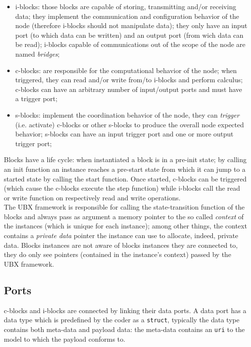 \begin{itemize}
	\item i-blocks: those blocks are capable of storing, transmitting and/or receiving data; they implement the communication and configuration behavior of the node (therefore i-blocks should not manipulate data); they only have an input port (to which data can be written) and an output port (from wich data can be read); i-blocks capable of communications out of the scope of the node are named \emph{bridges};
	\item c-blocks: are responsible for the computational behavior of the node; when triggered, they can read and/or write from/to i-blocks and perform calculus; c-blocks can have an arbitrary number of input/output ports and must have a trigger port;
	\item s-blocks: implement the coordination behavior of the node, they can \emph{trigger} (i.e. activate) c-blocks or other s-blocks to produce the overall node expected behavior; s-blocks can have an input trigger port and one or more output trigger port;
\end{itemize}
Blocks have a life cycle: when instantiated a block is in a  pre-init state; by calling an init function an instance reaches a pre-start state from which it can jump to a started state by calling the start function. Once started, c-blocks can be triggered (which cause the c-blocks execute the step function) while i-blocks call the read or write function on respectively read and write operations.\\
The UBX framework is responsible for calling the state-transition function of the blocks and always pass as argument a memory pointer to the so called \emph{context} of the instances (which is unique for each instance); among other things, the context contains a \emph{private data} pointer the instance can use to allocate, indeed, private data.
Blocks instances are not aware of blocks instances they are connected to, they do only see pointers (contained in the instance's context) passed by the UBX framework.

\subsection{Ports}
c-blocks and i-blocks are connected by linking their data ports. A data port has a data type which is predefined by the coder as a \texttt{struct}, typically the data type contains both meta-data and payload data: the meta-data contains an \texttt{uri} to the model to which the payload conforms to.

